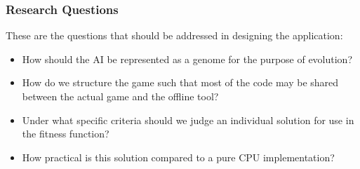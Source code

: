 \subsubsection*{Research Questions}
These are the questions that should be addressed in designing the application:
\begin{itemize}
 \item How should the AI be represented as a genome for the purpose of evolution?

 \item How do we structure the game such that most of the code may be shared between
the actual game and the offline tool?

 \item Under what specific criteria should we judge an individual solution for use in the
fitness function?

 \item How practical is this solution compared to a pure CPU implementation?
\end{itemize}